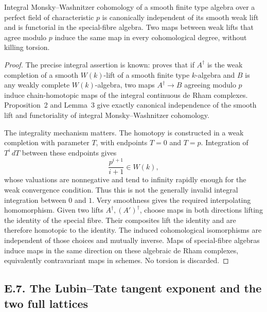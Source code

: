 \begin{theorem}\label{thm:DE-integral-MW-independence}
Integral Monsky--Washnitzer cohomology of a smooth finite type algebra over a perfect field of characteristic $p$ is canonically independent of its smooth weak lift and is functorial in the special-fibre algebra.  Two maps between weak lifts that agree modulo $p$ induce the same map in every cohomological degree, without killing torsion.
\end{theorem}
\begin{proof}
The precise integral assertion is known: \cite[Proposition~1]{ErtlSprang2018} proves that if $A^\dagger$ is the weak completion of a smooth $W(k)$-lift of a smooth finite type $k$-algebra and $B$ is any weakly complete $W(k)$-algebra, two maps $A^\dagger\to B$ agreeing modulo $p$ induce chain-homotopic maps of the integral continuous de Rham complexes.  Proposition~2 and Lemma~3 give exactly canonical independence of the smooth lift and functoriality of integral Monsky--Washnitzer cohomology.

The integrality mechanism matters.  The homotopy is constructed in a weak completion with parameter $T$, with endpoints $T=0$ and $T=p$.  Integration of $T^i\,dT$ between these endpoints gives
\[
 \frac{p^{i+1}}{i+1}\in W(k),
\]
whose valuations are nonnegative and tend to infinity rapidly enough for the weak convergence condition.  Thus this is not the generally invalid integral integration between $0$ and $1$.  Very smoothness gives the required interpolating homomorphism.  Given two lifts $A^\dagger,(A')^\dagger$, choose maps in both directions lifting the identity of the special fibre.  Their composites lift the identity and are therefore homotopic to the identity.  The induced cohomological isomorphisms are independent of those choices and mutually inverse.  Maps of special-fibre algebras induce maps in the same direction on these algebraic de Rham complexes, equivalently contravariant maps in schemes.  No torsion is discarded.
\end{proof}

\subsection{E.7. The Lubin--Tate tangent exponent and the two full lattices}

